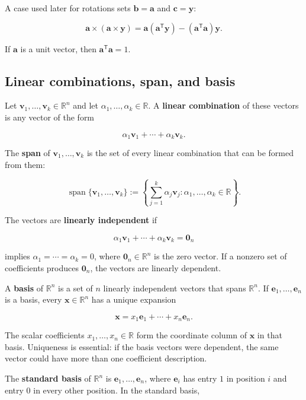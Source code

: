\documentclass[
  australian,
  12pt,
  letterpaper,
  DIV=11,
  numbers=noendperiod,
  twoside]{scrreprt}
\begin{document}
A case used later for rotations sets \(\mathbf b=\mathbf a\) and
\(\mathbf c=\mathbf y\):

\[
\boxed{
\mathbf a\times(\mathbf a\times\mathbf y)
=
\mathbf a(\mathbf a^\mathsf T\mathbf y)
-
(\mathbf a^\mathsf T\mathbf a)\mathbf y
}.
\]

If \(\mathbf a\) is a unit vector, then
\(\mathbf a^\mathsf T\mathbf a=1\).

\subsection{Linear combinations, span, and
basis}\label{linear-combinations-span-and-basis}

Let \(\mathbf v_1,\ldots,\mathbf v_k\in\mathbb R^n\) and let
\(\alpha_1,\ldots,\alpha_k\in\mathbb R\). A \textbf{linear combination}
of these vectors is any vector of the form

\[
\alpha_1\mathbf v_1+\cdots+\alpha_k\mathbf v_k.
\]

The \textbf{span} of \(\mathbf v_1,\ldots,\mathbf v_k\) is the set of
every linear combination that can be formed from them:

\[
\operatorname{span}\{\mathbf v_1,\ldots,\mathbf v_k\}
\mathrel{:=}
\left\{
\sum_{j=1}^{k}\alpha_j\mathbf v_j:
\alpha_1,\ldots,\alpha_k\in\mathbb R
\right\}.
\]

The vectors are \textbf{linearly independent} if

\[
\alpha_1\mathbf v_1+\cdots+\alpha_k\mathbf v_k=\mathbf 0_n
\]

implies \(\alpha_1=\cdots=\alpha_k=0\), where
\(\mathbf 0_n\in\mathbb R^n\) is the zero vector. If a nonzero set of
coefficients produces \(\mathbf 0_n\), the vectors are linearly
dependent.

A \textbf{basis} of \(\mathbb R^n\) is a set of \(n\) linearly
independent vectors that spans \(\mathbb R^n\). If
\(\mathbf e_1,\ldots,\mathbf e_n\) is a basis, every
\(\mathbf x\in\mathbb R^n\) has a unique expansion

\[
\mathbf x=x_1\mathbf e_1+\cdots+x_n\mathbf e_n.
\]

The scalar coefficients \(x_1,\ldots,x_n\in\mathbb R\) form the
coordinate column of \(\mathbf x\) in that basis. Uniqueness is
essential: if the basis vectors were dependent, the same vector could
have more than one coefficient description.

The \textbf{standard basis} of \(\mathbb R^n\) is
\(\mathbf e_1,\ldots,\mathbf e_n\), where \(\mathbf e_i\) has entry
\(1\) in position \(i\) and entry \(0\) in every other position. In the
standard basis,
\end{document}
